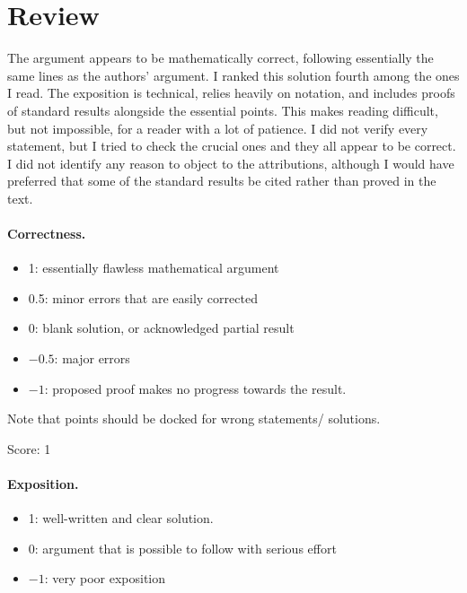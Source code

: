 \documentclass[11pt]{article}
\theoremstyle{definition}
\theoremstyle{remark}
\begin{document}
\maketitle

\section{Review}
The argument appears to be mathematically correct, following essentially the same lines as the authors' argument.  I ranked this solution fourth among the ones I read.  The exposition is technical, relies heavily on notation, and includes proofs of standard results alongside the essential points.  This makes reading difficult, but not impossible, for a reader with a lot of patience.  I did not verify every statement, but I tried to check the crucial ones and they all appear to be correct.  I did not identify any reason to object to the attributions, although I would have preferred that some of the standard results be cited rather than proved in the text.

\paragraph{Correctness.}
\begin{itemize}
	\item  1: essentially flawless mathematical argument
	\item  0.5: minor errors that are easily corrected
	\item  0: blank solution, or acknowledged partial result
	\item  $-0.5$: major errors
	\item  $-1$: proposed proof makes no progress towards the result.
\end{itemize}
Note that points should be docked for wrong statements/ solutions.

\noindent Score: 1

\paragraph{Exposition.}
\begin{itemize}
	\item  1: well-written and clear solution.
	\item  0: argument that is possible to follow with serious effort
	\item  $-1$: very poor exposition
\end{itemize}
\end{document}
